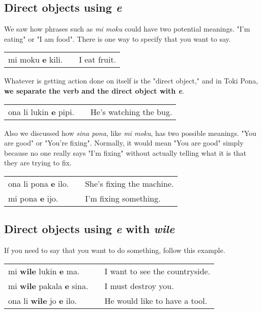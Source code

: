 \subsection*{Direct objects using \textit{e}}
%
We saw how phrases such as \textit{mi moku} could have two potential meanings. 
"I'm eating" or "I am food". 
There is one way to specify that you want to say. 

\begin{supertabular}{p{5,5cm}|ll}
mi moku \textbf{e} kili. && I eat fruit. \\
\end{supertabular} 

Whatever is getting action done on itself is the "direct object," and in Toki Pona, \textbf{we separate the verb and the direct object with \textit{e}}. 

\begin{supertabular}{p{5,5cm}|ll}
ona li lukin \textbf{e} pipi. && He's watching the bug. \\
\end{supertabular} 

Also we discussed how \textit{sina pona}, like \textit{mi moku}, has two possible meanings. "You are good" or "You're fixing". 
Normally, it would mean "You are good" simply because no one really says "I'm fixing" without actually telling what it is that they are trying to fix. 

\begin{supertabular}{p{5,5cm}|ll}
ona li pona \textbf{e} ilo. && She's fixing the machine. \\
mi pona \textbf{e} ijo. && I'm fixing something. \\
\end{supertabular} 

{}
\subsection*{Direct objects using \textit{e} with \textit{wile}}
%
If you need to say that you want to do something, follow this example.

\begin{supertabular}{p{5,5cm}|ll}
mi \textbf{wile} lukin \textbf{e} ma. && I want to see the countryside. \\
mi \textbf{wile} pakala \textbf{e} sina. && I must destroy you. \\
ona li \textbf{wile} jo \textbf{e} ilo. && He would like to have a tool. \\
\end{supertabular} 


